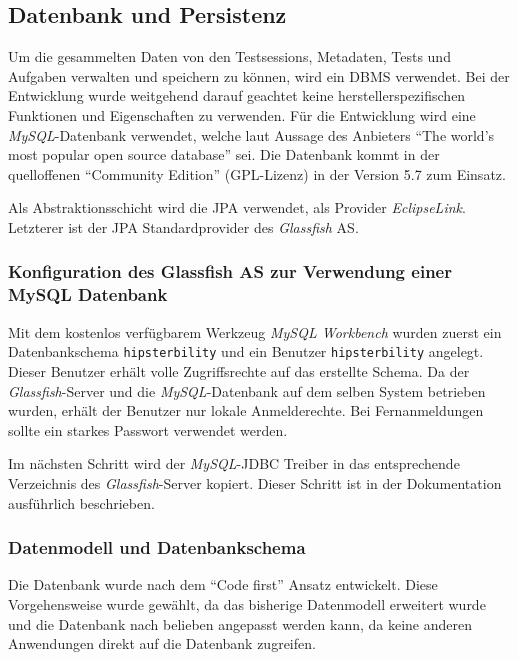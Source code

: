 \subsection{Datenbank und Persistenz\label{subsec:datenbank}}
Um die gesammelten Daten von den Testsessions, Metadaten, Tests und Aufgaben verwalten und speichern zu können, wird ein \ac{DBMS} verwendet.
Bei der Entwicklung wurde weitgehend darauf geachtet keine herstellerspezifischen Funktionen und Eigenschaften zu verwenden.
Für die Entwicklung wird eine \emph{MySQL}-Datenbank verwendet, welche laut Aussage des Anbieters \enquote{The world's most popular open source database} \cite{OracleCorporation.2014} sei.
Die Datenbank kommt in der quelloffenen \enquote{Community Edition} (\ac{GPL}-Lizenz) in der Version 5.7 zum Einsatz.

Als Abstraktionsschicht wird die \ac{JPA} verwendet, als Provider \emph{EclipseLink}.
Letzterer ist der \ac{JPA} Standardprovider des \emph{Glassfish} \ac{AS}. 

\subsubsection{Konfiguration des Glassfish AS zur Verwendung einer MySQL Datenbank}
Mit dem kostenlos verfügbarem Werkzeug \emph{MySQL Workbench} \cite{Oracle.2014b} wurden zuerst ein Datenbankschema \texttt{hipsterbility} und ein Benutzer \texttt{hipsterbility} angelegt.
Dieser Benutzer erhält volle Zugriffsrechte auf das erstellte Schema.
Da der \emph{Glassfish}-Server und die \emph{MySQL}-Datenbank auf dem selben System betrieben wurden, erhält der Benutzer nur lokale Anmelderechte.
Bei Fernanmeldungen sollte ein starkes Passwort verwendet werden.

Im nächsten Schritt wird der \emph{MySQL}-\ac{JDBC} Treiber in das entsprechende Verzeichnis des \emph{Glassfish}-Server kopiert. Dieser Schritt ist in der Dokumentation \cite{OracleCorporation.2014b} ausführlich beschrieben.



\subsubsection{Datenmodell und Datenbankschema}
Die Datenbank wurde nach dem \enquote{Code first} Ansatz entwickelt.
Diese Vorgehensweise wurde gewählt, da das bisherige Datenmodell erweitert wurde und die Datenbank nach belieben angepasst werden kann, da keine anderen Anwendungen direkt auf die Datenbank zugreifen.

